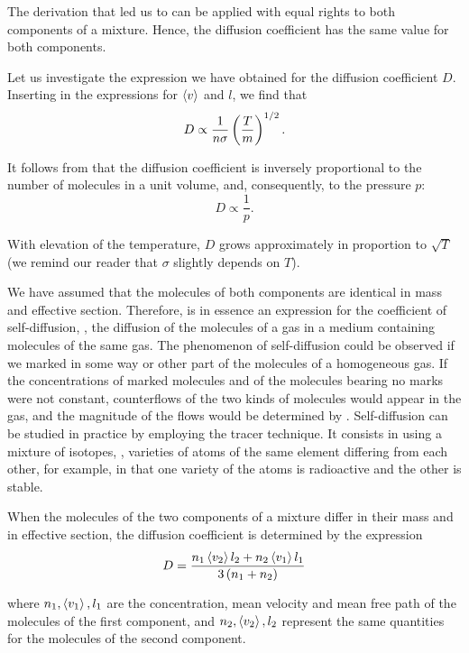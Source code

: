 The derivation that led us to  can be applied with equal rights to both components of a mixture. Hence, the diffusion coefficient has the same value for both components.

Let us investigate the expression we have obtained for the diffusion coefficient $D$. Inserting in  the expressions for $\left\langle v \right\rangle$ and $l$, we find that
\begin{equation}\label{eq:16_19}
    D \propto \frac{1}{n\sigma} \left(\frac{T}{m}\right)^{1/2}.
\end{equation}

\noindent
It follows from  that the diffusion coefficient is inversely proportional to the number of molecules in a unit volume, and, consequently, to the pressure $p$:
\begin{equation*}
    D \propto \frac{1}{p}.
\end{equation*}

\noindent
With elevation of the temperature, $D$ grows approximately in proportion to $\sqrt{T}$ (we remind our reader that $\sigma$ slightly depends on $T$).

We have assumed that the molecules of both components are identical in mass and effective section. Therefore,  is in essence an expression for the coefficient of self-diffusion, \ie, the diffusion of the molecules of a gas in a medium containing molecules of the same gas. The phenomenon of self-diffusion could be observed if we marked in some way or other part of the molecules of a homogeneous gas. If the concentrations of marked molecules and of the molecules bearing no marks were not constant, counterflows of the two kinds of molecules would appear in the gas, and the magnitude of the flows would be determined by . Self-diffusion can be studied in practice by employing the tracer technique. It consists in using a mixture of isotopes, \ie, varieties of atoms of the same element differing from each other, for example, in that one variety of the atoms is radioactive and the other is stable.

When the molecules of the two components of a mixture differ in their mass and in effective section, the diffusion coefficient is determined by the expression
\begin{equation*}
    D = \frac{n_1\left\langle v_2 \right\rangle l_2 + n_2\left\langle v_1 \right\rangle l_1}{3\left(n_1 + n_2\right)}
\end{equation*}

\noindent
where $n_1, \left\langle v_1 \right\rangle, l_1$ are the concentration, mean velocity and mean free path of the molecules of the first component, and $n_2, \left\langle v_2 \right\rangle, l_2$ represent the same quantities for the molecules of the second component.

